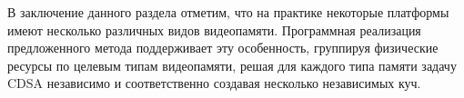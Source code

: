 В заключение данного раздела отметим, что на практике некоторые платформы имеют несколько различных видов видеопамяти.
Программная реализация предложенного метода поддерживает эту особенность, группируя физические ресурсы по целевым типам видеопамяти, решая для каждого типа памяти задачу CDSA независимо и соответственно создавая несколько независимых куч.
